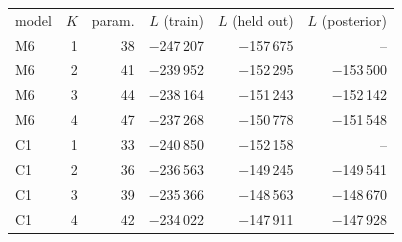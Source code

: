 \begin{ruledtabular}
\begin{tabular}{lrrrrr}
model & $K$ & param. & $L$ (train) & $L$ (held out) & $L$ (posterior) \\
\colrule
M6 & 1 & 38 & $-$247\,207 & $-$157\,675 & -- \\
M6 & 2 & 41 & $-$239\,952 & $-$152\,295 & $-$153\,500 \\
M6 & 3 & 44 & $-$238\,164 & $-$151\,243 & $-$152\,142 \\
M6 & 4 & 47 & $-$237\,268 & $-$150\,778 & $-$151\,548 \\
C1 & 1 & 33 & $-$240\,850 & $-$152\,158 & -- \\
C1 & 2 & 36 & $-$236\,563 & $-$149\,245 & $-$149\,541 \\
C1 & 3 & 39 & $-$235\,366 & $-$148\,563 & $-$148\,670 \\
C1 & 4 & 42 & $-$234\,022 & $-$147\,911 & $-$147\,928 \\
\end{tabular}
\end{ruledtabular}
